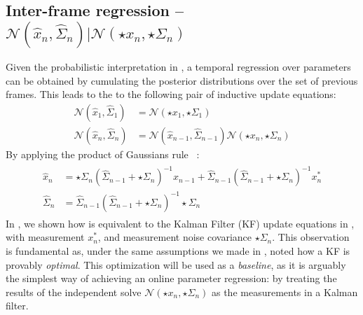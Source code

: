 \subsection{Inter-frame regression -- $\mathcal{N}(\hat{x}_n, \hat{\Sigma}_n) | \mathcal{N}(\star{x}_n, \star{\Sigma}_n)$ } 
\label{sec:combining}
\label{sec:inter}
Given the probabilistic interpretation in , a temporal regression over parameters can be obtained by cumulating the posterior distributions over the set of previous frames. This leads to the to the following pair of inductive update equations:
% 
\begin{align}
\mathcal{N}(\hat{x}_1, \hat{\Sigma}_1) &= \mathcal{N}(\star{x}_1, \star{\Sigma}_1) \\
\mathcal{N}(\hat{x}_n, \hat{\Sigma}_n) &= \mathcal{N}(\hat{x}_{n-1}, \hat{\Sigma}_{n-1}) \mathcal{N}(\star{x}_n, \star{\Sigma}_n)
\end{align}
% 
By applying the product of Gaussians rule ~\cite{petersen2008matrix}:
% 
\begin{align}
\begin{split}
\hat{x}_{n} &= \star\Sigma_{n} (\hat{\Sigma}_{n-1} + \star\Sigma_{n})^{-1} \hat{x}_{n-1} + 
\hat{\Sigma}_{n-1} (\hat{\Sigma}_{n-1} + \star\Sigma_n)^{-1} x_n^*
\\
\hat{\Sigma}_n &= \hat{\Sigma}_{n-1} (\hat{\Sigma}_{n-1} + {\star\Sigma_n})^{-1} \star\Sigma_n
\label{eq:combining}
\end{split}
\end{align}
% 
In , we shown how  is equivalent to the Kalman Filter (KF) update equations in , with measurement $x_n^*$, and measurement noise covariance $\star\Sigma_n$. This observation is fundamental as, under the same assumptions we made in , \cite[]{maybeck1979stochastic} noted how a KF is provably \emph{optimal}.
This optimization will be used as a \emph{baseline}, as it is arguably the simplest way of achieving an online parameter regression: by treating the results of the independent solve $\mathcal{N}(\star{x}_n, \star{\Sigma}_n)$ as the measurements in a Kalman filter.

